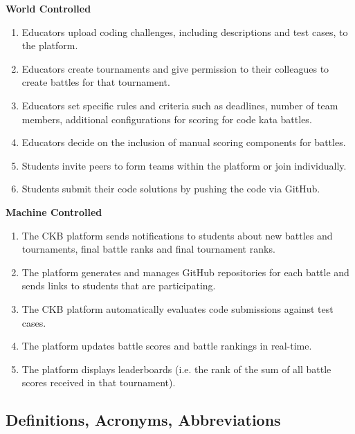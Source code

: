 \quad \space \space \textbf{World Controlled}
\begin{enumerate}
    \item Educators upload coding challenges, including descriptions and test cases, to the platform.
    \item Educators create tournaments and give permission to their colleagues to create battles for that tournament.
    \item Educators set specific rules and criteria such as deadlines, number of team members, additional configurations for scoring for code kata battles.
    \item Educators decide on the inclusion of manual scoring components for battles.
    \item Students invite peers to form teams within the platform or join individually.
    \item Students submit their code solutions by pushing the code via GitHub.
    
\end{enumerate}

\textbf{Machine Controlled}
\begin{enumerate}[resume]
    \item The CKB platform sends notifications to students about new battles and tournaments, final battle ranks and final tournament ranks.
    \item The platform generates and manages GitHub repositories for each battle and sends links to students that are participating.
    \item The CKB platform automatically evaluates code submissions against test cases.
    \item The platform updates battle scores and battle rankings in real-time.
    \item The platform displays leaderboards (i.e. the rank of the sum of all battle scores received in that tournament).
\end{enumerate}

\subsection{Definitions, Acronyms, Abbreviations}


